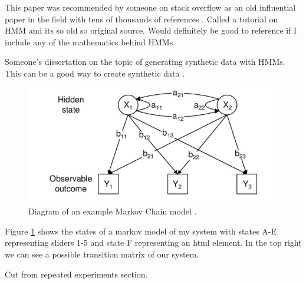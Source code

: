 \documentclass{article}
\begin{document}
This paper was recommended by someone on stack overflow as an old influential paper in the field with tens of thousands of references \cite{rabiner1989tutorial}.
Called a tutorial on HMM and its so old so original source. 
Would definitely be good to reference if I include any of the mathematics behind HMMs. 

Someone's dissertation on the topic of generating synthetic data with HMMs.
This can be a good way to create synthetic data \cite{ferrando2018generating}.


\begin{figure}[ht]
    \centering
    \includegraphics[scale=1.5]{Images/HMM-Paper-Diagram.png}
    \caption{Diagram of an example Markov Chain model \cite{choudhury2007state}.}
    \label{fig:Markov}
\end{figure}

Figure \ref{fig:Markov} shows the states of a markov model of my system with states A-E representing sliders 1-5 and state F representing an html element.
In the top right we can see a possible transition matrix of our system.



Cut from repeated experiments section.
\end{document}
